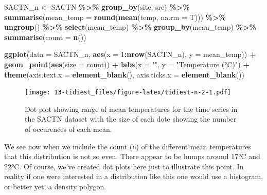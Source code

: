 \documentclass[
]{book}
\newenvironment{Shaded}{\begin{snugshade}}{\end{snugshade}}
\newcommand{\DataTypeTok}[1]{\textcolor[rgb]{0.13,0.29,0.53}{#1}}
\newcommand{\DecValTok}[1]{\textcolor[rgb]{0.00,0.00,0.81}{#1}}
\newcommand{\KeywordTok}[1]{\textcolor[rgb]{0.13,0.29,0.53}{\textbf{#1}}}
\newcommand{\NormalTok}[1]{#1}
\newcommand{\OperatorTok}[1]{\textcolor[rgb]{0.81,0.36,0.00}{\textbf{#1}}}
\newcommand{\StringTok}[1]{\textcolor[rgb]{0.31,0.60,0.02}{#1}}
\begin{document}
\begin{Shaded}
\begin{Highlighting}[]
\NormalTok{ SACTN\_n <{-}}\StringTok{ }\NormalTok{SACTN }\OperatorTok{\%>\%}\StringTok{ }
\StringTok{  }\KeywordTok{group\_by}\NormalTok{(site, src) }\OperatorTok{\%>\%}\StringTok{ }
\StringTok{  }\KeywordTok{summarise}\NormalTok{(}\DataTypeTok{mean\_temp =} \KeywordTok{round}\NormalTok{(}\KeywordTok{mean}\NormalTok{(temp, }\DataTypeTok{na.rm =}\NormalTok{ T))) }\OperatorTok{\%>\%}\StringTok{ }
\StringTok{  }\KeywordTok{ungroup}\NormalTok{() }\OperatorTok{\%>\%}\StringTok{ }
\StringTok{  }\KeywordTok{select}\NormalTok{(mean\_temp) }\OperatorTok{\%>\%}\StringTok{ }
\StringTok{  }\KeywordTok{group\_by}\NormalTok{(mean\_temp) }\OperatorTok{\%>\%}\StringTok{ }
\StringTok{  }\KeywordTok{summarise}\NormalTok{(}\DataTypeTok{count =} \KeywordTok{n}\NormalTok{())}

\KeywordTok{ggplot}\NormalTok{(}\DataTypeTok{data =}\NormalTok{ SACTN\_n, }\KeywordTok{aes}\NormalTok{(}\DataTypeTok{x =} \DecValTok{1}\OperatorTok{:}\KeywordTok{nrow}\NormalTok{(SACTN\_n), }\DataTypeTok{y =}\NormalTok{ mean\_temp)) }\OperatorTok{+}
\StringTok{  }\KeywordTok{geom\_point}\NormalTok{(}\KeywordTok{aes}\NormalTok{(}\DataTypeTok{size =}\NormalTok{ count)) }\OperatorTok{+}
\StringTok{  }\KeywordTok{labs}\NormalTok{(}\DataTypeTok{x =} \StringTok{""}\NormalTok{, }\DataTypeTok{y =} \StringTok{"Temperature (°C)"}\NormalTok{) }\OperatorTok{+}
\StringTok{  }\KeywordTok{theme}\NormalTok{(}\DataTypeTok{axis.text.x =} \KeywordTok{element\_blank}\NormalTok{(), }
        \DataTypeTok{axis.ticks.x =} \KeywordTok{element\_blank}\NormalTok{())}
\end{Highlighting}
\end{Shaded}

\begin{figure}
\centering
\texttt{[image: 13-tidiest\_files/figure-latex/tidiest-n-2-1.pdf]}
\caption{\label{fig:tidiest-n-2}Dot plot showing range of mean temperatures for the time series in the SACTN dataset with the size of each dote showing the number of occurences of each mean.}
\end{figure}

We see now when we include the count (\texttt{n}) of the different mean temperatures that this distribution is not so even. There appear to be humps around 17°C and 22°C. Of course, we've created dot plots here just to illustrate this point. In reality if one were interested in a distribution like this one would use a histogram, or better yet, a density polygon.
\end{document}
